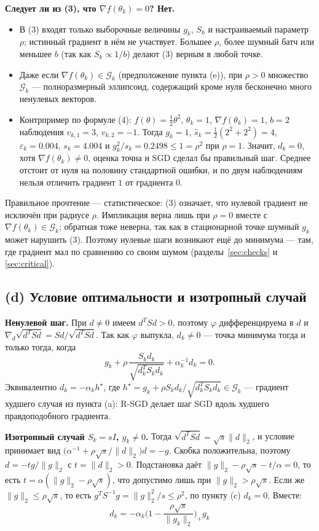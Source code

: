 \documentclass[11pt,a4paper]{article}
\newcommand{\G}{\mathcal{G}_k}
\newcommand{\norm}[1]{\lVert #1\rVert_2}
\begin{document}
\textbf{Следует ли из (3), что $\nabla f(\theta_k)=0$? Нет.}
\begin{itemize}
\item В (3) входят только выборочные величины $g_k$, $S_k$ и настраиваемый параметр $\rho$;
истинный градиент в нём не участвует. Большее $\rho$, более шумный батч или меньшее $b$ (так как
$S_k\propto1/b$) делают (3) верным в любой точке.
\item Даже если $\nabla f(\theta_k)\in\G$ (предположение пункта (e)), при $\rho>0$ множество $\G$ —
полноразмерный эллипсоид, содержащий кроме нуля бесконечно много ненулевых векторов.
\item Контрпример по формуле (4): $f(\theta)=\tfrac12\theta^2$, $\theta_k=1$,
$\nabla f(\theta_k)=1$, $b=2$ наблюдения $v_{k,1}=3$, $v_{k,2}=-1$. Тогда $g_k=1$,
$\widehat s_k=\tfrac12(2^2+2^2)=4$, $\varepsilon_k=0.004$, $s_k=4.004$ и
$g_k^2/s_k=0.2498\le1=\rho^2$ при $\rho=1$. Значит, $d_k=0$, хотя $\nabla f(\theta_k)\ne0$, оценка
точна и SGD сделал бы правильный шаг. Среднее отстоит от нуля на половину стандартной ошибки, и по
двум наблюдениям нельзя отличить градиент $1$ от градиента $0$.
\end{itemize}
Правильное прочтение — статистическое: (3) означает, что нулевой градиент не исключён при радиусе
$\rho$. Импликация верна лишь при $\rho=0$ вместе с $\nabla f(\theta_k)\in\G$; обратная тоже
неверна, так как в стационарной точке шумный $g_k$ может нарушить (3). Поэтому нулевые шаги
возникают ещё до минимума — там, где градиент мал по сравнению со своим шумом (разделы~\ref{sec:checks}
и \ref{sec:critical}).

\subsection{(d) Условие оптимальности и изотропный случай}

\textbf{Ненулевой шаг.} При $d\ne0$ имеем $d^TSd>0$, поэтому $\varphi$ дифференцируема в $d$ и
$\nabla_d\sqrt{d^TSd}=Sd/\sqrt{d^TSd}$. Так как $\varphi$ выпукла, $d_k\ne0$ — точка минимума тогда
и только тогда, когда
\begin{equation*}
g_k+\rho\,\frac{S_kd_k}{\sqrt{d_k^TS_kd_k}}+\alpha_k^{-1}d_k=0 .
\end{equation*}
Эквивалентно $d_k=-\alpha_kh^\star$, где $h^\star=g_k+\rho S_kd_k/\sqrt{d_k^TS_kd_k}\in\G$ —
градиент худшего случая из пункта (a): R-SGD делает шаг SGD вдоль худшего правдоподобного
градиента.

\textbf{Изотропный случай $S_k=sI$, $g_k\ne0$.} Тогда $\sqrt{d^TSd}=\sqrt s\norm d$, и условие
принимает вид $\big(\alpha^{-1}+\rho\sqrt s/\norm d\big)d=-g$. Скобка положительна, поэтому
$d=-tg/\norm g$ с $t=\norm d>0$. Подстановка даёт $\norm g-\rho\sqrt s-t/\alpha=0$, то есть
$t=\alpha(\norm g-\rho\sqrt s)$, что допустимо лишь при $\norm g>\rho\sqrt s$. Если же
$\norm g\le\rho\sqrt s$, то есть $g^TS^{-1}g=\norm g^2/s\le\rho^2$, по пункту (c) $d_k=0$. Вместе:
\begin{equation*}
\boxed{\;d_k=-\alpha_k\Big(1-\frac{\rho\sqrt s}{\norm{g_k}}\Big)_+g_k\;}
\end{equation*}
\end{document}

